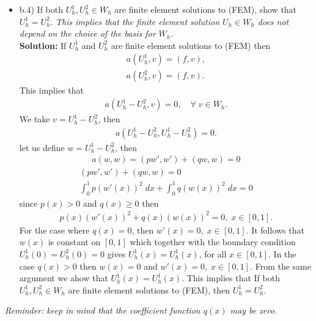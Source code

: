 \documentclass[11pt]{article}      %
\begin{document}
\begin{enumerate}
\begin{enumerate}
\begin{itemize}
$$\mathbf{c}^T {\bf A} {\bf c} = 0 \iff {\bf c} = {\bf 0}.$$
This shows that 
$\mathbf{c}^T {\bf A} {\bf c} > 0,$ hence ${\bf A}$ is positive definite.
To show that ${\bf A}$ is symmetric we need to show that $a_{ij} = a_{ji}$. 
\begin{align}
	a_{ij} &= (p\phi'_j,\phi'_i) + (q\phi_j,\phi_i)\\
		&= \int_{0}^{1}(p(x)\phi_j'(x))\phi_i'(x)\,dx + \int_{0}^{1}(q(x)\phi_j(x))\phi_i(x)\,dx,\\
	& = \int_{0}^{1}(p(x)\phi_i'(x))\phi_j'(x)\,dx + \int_{0}^{1}(q(x)\phi_i(x))\phi_j(x)\,dx,\\
	&= (p\phi'_i,\phi'_j) + (q\phi_i,\phi_j) = a{ji}.
\end{align}
Hence ${\bf A}$ is symmetric positive definite.

\item[]b.4) If both $U_h^1, U_h^2 \in W_h$ are finite element solutions to (FEM), show that $U_h^1=U_h^2$. {\em This implies that  the finite element solution $U_h\in W_h$  does not depend on the choice of the basis for $W_h$.}\\
{\bf Solution:} If $U^1_h$ and $U^2_h$ are finite element solutions to (FEM) then 
\begin{align*}
	a(U_h^1 ,v) = (f,v),\\
	a(U_h^2,v) = (f,v).
\end{align*}
This implies that
\begin{align}
	a(U^1_h - U_h^2,v) = 0, \quad \forall\; v\in W_h.
\end{align}
We take $v = U^1_h - U^2_h$, then 
\begin{align*}
	a(U^1_h - U_h^2,U^1_h - U^2_h) = 0.
\end{align*}
let us define $w = U^1_h - U^2_h$, then  
\begin{align*}
	a(w,w) = (pw',w') + (qw,w) = 0
\end{align*}
\begin{align}
	(pw',w') + (qw,w) = 0\\
	\int_{0}^{1}p(w'(x))^2 \;dx + \int_{0}^{1}q(w(x))^2 \;dx = 0
\end{align}
since $p(x)>0$ and $q(x)\geq0$ then 
\begin{align}
	p(x)(w'(x))^2 + q(x)(w(x))^2 = 0, \; x\in [0,1].
\end{align}
For the case where $q(x) = 0$, then 
$w'(x) = 0 ,\; x\in [0,1]$. It follows that $w(x)$ is constant on $[0,1]$ which together with the boundary condition $U_h^1(0)=U_h^2(0) = 0$ gives $U_h^1(x) = U_h^1(x)$, for all $x\in[0,1]$. In the case $q(x)>0$ then $w(x) = 0$ and $w'(x) = 0 ,\; x\in [0,1]$. From the same argument we ahow that $U_h^1(x) = U_h^1(x)$.  This implies that If both $U_h^1, U_h^2 \in W_h$ are finite element solutions to (FEM), then $U_h^1=U_h^2$.
\end{itemize}
{\em Reminder:  keep in mind that the coefficient function $q(x)$ may be zero.}
\end{enumerate}


\end{enumerate}
\end{document}
